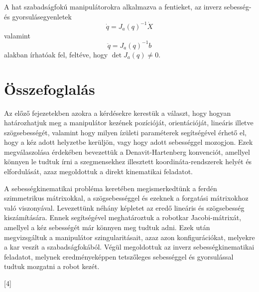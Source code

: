 \documentclass[12pt,a4paper]{report}
\theoremstyle{remark}
\theoremstyle{definition}
\begin{document}
A hat szabadságfokú manipulátorokra alkalmazva a fentieket, az inverz sebesség- és gyorsulásegyenletek
\begin{equation}
\dot{q} = J_a(q)^{-1}\dot{X}
\end{equation}
valamint
\begin{equation}
\ddot{q} = J_a(q)^{-1}b
\end{equation}
alakban írhatóak fel, feltéve, hogy $\det J_a(q) \neq 0$.

\chapter{Összefoglalás}
Az előző fejezetekben azokra a kérdésekre kerestük a választ, hogy hogyan határozhatjuk meg a manipulátor kezének 
pozícióját, orientációját, lineáris illetve szögsebességét, valamint hogy milyen ízületi paraméterek segítségével 
érhető el, hogy a kéz adott helyzetbe kerüljön, vagy hogy adott sebességgel mozogjon. Ezek megválaszolása érdekében 
bevezettük a Denavit-Hartenberg konvenciót, amellyel könnyen le tudtuk írni a szegmensekhez illesztett 
koordináta-rendszerek helyét és elfordulását, azaz megoldottuk a direkt kinematikai feladatot. 

A sebességkinematikai probléma keretében megismerkedtünk a ferdén szimmetrikus mátrixokkal, a szögsebességgel és 
ezeknek a forgatási mátrixokhoz való viszonyával. Levezettünk néhány képletet az eredő lineáris és szögsebesség 
kiszámítására. Ennek segítségével meghatároztuk a robotkar Jacobi-mátrixát, amellyel a kéz sebességét már könnyen 
meg tudtuk adni. Ezek után megvizsgáltuk a manipulátor szingularitásait, azaz azon konfigurációkat, melyekre a kar 
veszít a szabadságfokából. Végül megoldottuk az inverz sebességkinematikai feladatot, melynek eredményeképpen 
tetszőleges sebességgel és gyorsulással tudtuk mozgatni a robot kezét.

\nocite{*}

[4]{%
  \ifuseprefix
    {%
     \isdot
     }%
    {%
     \isdot
     }}
     
\renewcommand\mkbibnamelast[1]{\textsc{#1}}

\printbibliography
\end{document}
